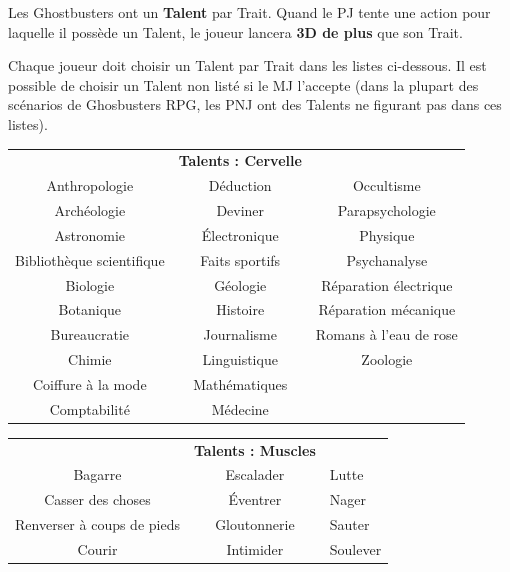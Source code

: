 \begin{frame}[b]
{\begin{minipage}[c][0.95\textheight][c]{\linewidth}

\myindent Les Ghostbusters ont un \textbf{Talent} par Trait. Quand le PJ tente une action pour laquelle il possède un Talent, le joueur lancera \textbf{3D de plus} que son Trait.

\myindent Chaque joueur doit choisir un Talent par Trait dans les listes ci-dessous. Il est possible de choisir un Talent non listé si le MJ l'accepte (dans la plupart des scénarios de Ghosbusters RPG, les PNJ ont des Talents ne figurant pas dans ces listes).
\end{minipage}
}{
\begin{minipage}[c][0.95\textheight][c]{\linewidth}
\begin{center}
\begin{tabular}{ccc}
&\textbf{Talents : Cervelle}&\\
Anthropologie & Déduction & Occultisme \\
Archéologie & Deviner & Parapsychologie \\
Astronomie & Électronique &  Physique \\
Bibliothèque scientifique & Faits sportifs & Psychanalyse \\
Biologie & Géologie & Réparation électrique \\
Botanique & Histoire & Réparation mécanique \\
Bureaucratie & Journalisme & Romans à l'eau de rose \\
Chimie & Linguistique & Zoologie \\
Coiffure à la mode & Mathématiques & \\
Comptabilité & Médecine & \\
\end{tabular}
\end{center}

\begin{center}
\begin{tabular}{cc>{\centering\arraybackslash}p{2.5cm}}
& \textbf{Talents : Muscles} &  \\
Bagarre & Escalader & Lutte \\
Casser des choses & Éventrer & Nager \\
Renverser à coups de pieds & Gloutonnerie & Sauter \\
Courir & Intimider & Soulever \\
\end{tabular}
\end{center}


\end{minipage}}
\end{frame}
